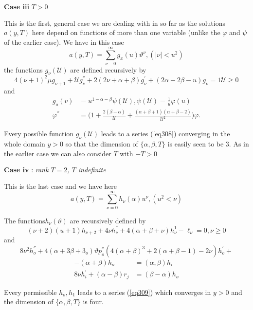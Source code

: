 \noindent
\textbf{Case iii} $T > 0$

This is the first, general case we are dealing with in so far as the
solutions $a(y, T)$ here depend on functions of more than one
variable (unlike the $\varphi$  and $\psi$ of the earlier case). We
have in this case 
\begin{equation*}
a (y, T) = \sum^{\infty}_{\nu - 0} g_x (u) \vartheta^\nu , (|\nu|
< u^2)\tag{308}\label{eq308} 
\end{equation*}
the functions $g_\nu (\mathcal{U})$ are defined recursively by 
$$ 
4 (\nu +1)^2 \mu g_{\nu + 1} + \mathcal{U} g^{''}_\nu + 2 (2 \nu +
\alpha + \beta) g^{'}_\nu + (2 \alpha - 2 \beta - u) g_{\nu} = 1
\mathcal{U} \ge 0 
$$
and 
\begin{align*}
g_o (v) & = u^{1 - \alpha - \beta} \psi(\mathcal{U}),
\psi(\mathcal{U}) = \frac{1}{u} \varphi (u)\\ 
\varphi^{''} & = \bigg(1 + \frac{2 (\beta - \alpha)}{\mathcal{U}} +
\frac{(\alpha + \beta + 1) (\alpha + \beta -2)}{\mathcal{U}^2} \bigg)
\varphi. 
\end{align*}

Every possible function $g_\nu (\mathcal{U})$ leads to a series
(\ref{eq308}) converging in the whole domain $y > 0$ so that the
dimension of $\{\alpha, \beta, T \}$ is easily seen to be 3. As in
the earlier case we can also consider $T$ with $- T > 0$ 

\noindent
\textbf{Case iv} : \textit{ rank $T = 2$, $T$ indefinite}

This is the last case and we have here
\begin{equation*}
a(y, T) = \sum_{\nu = 0}^\infty h_\nu (\alpha) u^\nu,
(u^2 < \nu)\tag{309}\label{eq309} 
\end{equation*}

The functions\pageoriginale $h_\nu (\vartheta)$ are recursively
defined by  
$$
(\nu + 2) (u + 1) h_{\nu + 2} + 4 \nu h^{''}_\nu + 4 (\alpha + \beta +
\nu) h^1_\nu - \ell_\nu  = 0, \nu \ge 0 
$$
and 
$$
8 \nu^2 h^{''}_o + 4 (\alpha + 3 \beta + 3_o) \vartheta p^{''}_o (4
(\alpha + \beta)^3 + 2 (\alpha + \beta -1) -2 \nu) h^{'}_o + 
$$
\begin{align*}
- (\alpha + \beta) h_o & = (\alpha, \beta)h_i\\
8 \nu h^{'}_{i} + (\alpha - \beta) r_j & = (\beta - \alpha) h_o
\end{align*}

Every permissible $h_o, h_1$ leads to a series (\ref{eq309}) which converges
in $y > 0$ and the dimension of $\{ \alpha, \beta, T \}$ is
four. 

